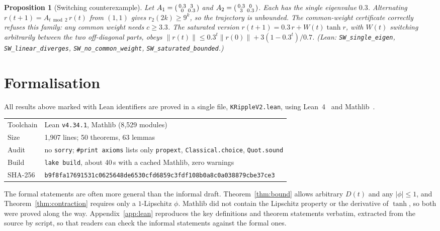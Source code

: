 \documentclass[11pt]{article}
\newtheorem{proposition}[theorem]{Proposition}
\theoremstyle{definition}
\theoremstyle{remark}
\newcommand{\lean}[1]{\texttt{\small #1}}
\begin{document}
\begin{proposition}[Switching counterexample]
Let $A_1=\begin{psmallmatrix}0.3&3\\0&0.3\end{psmallmatrix}$ and
$A_2=\begin{psmallmatrix}0.3&0\\3&0.3\end{psmallmatrix}$. Each has the single eigenvalue $0.3$. Alternating
$r(t+1)=A_{t\bmod 2}\,r(t)$ from $(1,1)$ gives $r_2(2k)\ge9^k$, so the trajectory is unbounded. The
common-weight certificate correctly refuses this family: any common weight needs $c\ge3.3$. The
saturated version $r(t+1)=0.3\,r+W(t)\tanh r$, with $W(t)$ switching arbitrarily between the two
off-diagonal parts, obeys $\|r(t)\|\le0.3^t\|r(0)\|+3(1-0.3^t)/0.7$.
(Lean: \lean{SW\_single\_eigen}, \lean{SW\_linear\_diverges}, \lean{SW\_no\_common\_weight},
\lean{SW\_saturated\_bounded}.)
\end{proposition}

\section{Formalisation}\label{sec:formal}

All results above marked with Lean identifiers are proved in a single file, \texttt{KRippleV2.lean},
using Lean~4~\cite{moura2021} and Mathlib~\cite{mathlib2020}.

\begin{center}
\begin{tabular}{@{}ll@{}}
\toprule
Toolchain & Lean \texttt{v4.34.1}, Mathlib (8{,}529 modules) \\
Size & 1{,}907 lines; 50 theorems, 63 lemmas \\
Audit & no \texttt{sorry}; \texttt{\#print axioms} lists only \texttt{propext}, \texttt{Classical.choice}, \texttt{Quot.sound} \\
Build & \texttt{lake build}, about 40\,s with a cached Mathlib, zero warnings \\
SHA-256 & \texttt{\footnotesize b9f8fa17691531c0625648de6530cfd6859c3fdf108b0a8c0a038879cbe37ce3} \\
\bottomrule
\end{tabular}
\end{center}

The formal statements are often more general than the informal draft. Theorem~\ref{thm:bound} allows
arbitrary $D(t)$ and any $|\phi|\le1$, and Theorem~\ref{thm:contraction} requires only a $1$-Lipschitz
$\phi$. Mathlib did not contain the Lipschitz property or the derivative of $\tanh$, so both were proved
along the way. Appendix~\ref{app:lean} reproduces the key definitions and theorem statements verbatim,
extracted from the source by script, so that readers can check the informal statements against the
formal ones.
\end{document}
